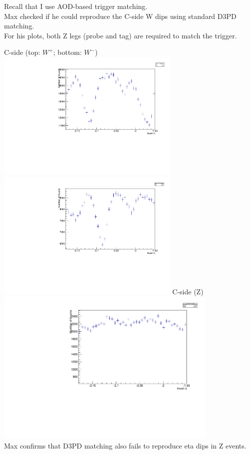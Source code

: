 \begin{frame}[label=D3PD]
Recall that I use AOD-based trigger matching. \\
Max checked if he could reproduce the C-side W dips using standard D3PD matching. \\
For his plots, both Z legs (probe and tag) are required to match the trigger.
\end{frame}
 {
\colb[T]
C-side (top: $W^+$; bottom: $W^-$)
\centering
\includegraphics[width=0.66\textwidth]{dates/20130306/figures/max/mueta_Wp} \\
\includegraphics[width=0.66\textwidth]{dates/20130306/figures/max/mueta_Wm}
C-side (Z) \\
\centering
\includegraphics[width=0.80\textwidth]{dates/20130306/figures/max/mueta_Z} \\
Max confirms that D3PD matching also fails to reproduce eta dips in Z events.
\cole
}

